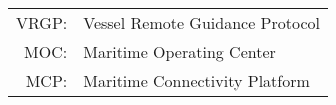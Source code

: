 \begin{tabular}{rl}
	VRGP: & Vessel Remote Guidance Protocol \\
	MOC: & Maritime Operating Center \\
	MCP: & Maritime Connectivity Platform
\end{tabular}
